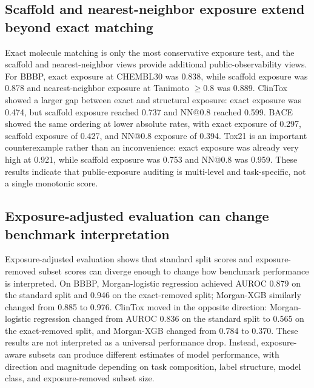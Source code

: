 \documentclass[unnumsec,webpdf,contemporary,large,numbered]{oup-authoring-template}
\begin{document}
\subsection{Scaffold and nearest-neighbor exposure extend beyond exact matching}

Exact molecule matching is only the most conservative exposure test, and the scaffold and nearest-neighbor views provide additional public-observability views. For BBBP, exact exposure at CHEMBL30 was 0.838, while scaffold exposure was 0.878 and nearest-neighbor exposure at Tanimoto $\geq 0.8$ was 0.889. ClinTox showed a larger gap between exact and structural exposure: exact exposure was 0.474, but scaffold exposure reached 0.737 and NN@0.8 reached 0.599. BACE showed the same ordering at lower absolute rates, with exact exposure of 0.297, scaffold exposure of 0.427, and NN@0.8 exposure of 0.394. Tox21 is an important counterexample rather than an inconvenience: exact exposure was already very high at 0.921, while scaffold exposure was 0.753 and NN@0.8 was 0.959. These results indicate that public-exposure auditing is multi-level and task-specific, not a single monotonic score.

\subsection{Exposure-adjusted evaluation can change benchmark interpretation}

Exposure-adjusted evaluation shows that standard split scores and exposure-removed subset scores can diverge enough to change how benchmark performance is interpreted. On BBBP, Morgan-logistic regression achieved AUROC 0.879 on the standard split and 0.946 on the exact-removed split; Morgan-XGB similarly changed from 0.885 to 0.976. ClinTox moved in the opposite direction: Morgan-logistic regression changed from AUROC 0.836 on the standard split to 0.565 on the exact-removed split, and Morgan-XGB changed from 0.784 to 0.370. These results are not interpreted as a universal performance drop. Instead, exposure-aware subsets can produce different estimates of model performance, with direction and magnitude depending on task composition, label structure, model class, and exposure-removed subset size.
\end{document}
